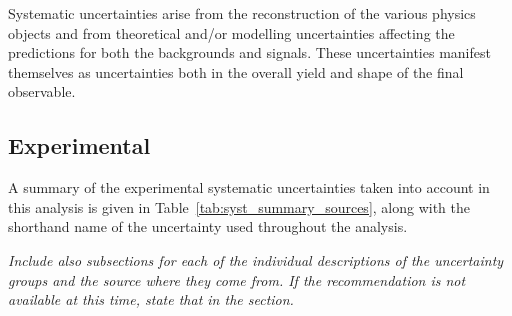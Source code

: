 Systematic uncertainties arise from the reconstruction of the various physics objects and 
from theoretical and/or modelling uncertainties affecting the predictions for both the backgrounds and signals. 
These uncertainties manifest themselves as uncertainties both in the overall yield and 
shape of the final observable.

\subsection{Experimental}

A summary of the experimental systematic uncertainties taken into account in this analysis is given in
Table~\ref{tab:syst_summary_sources}, along with the shorthand name of the uncertainty used throughout 
the analysis. 

\textit{Include also subsections for each of the individual descriptions of the uncertainty groups and the
source where they come from.  If the recommendation is not available at this time, state that in the section.}

